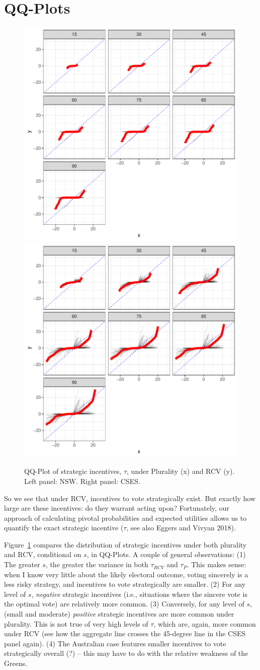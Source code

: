 \documentclass[11pt, letter, margin = 2 in]{article}
\begin{document}
\section{QQ-Plots}

\begin{figure}[!h]
	\centering
	\includegraphics[width = .45 \textwidth]{"../output/figures/australia_sv_qq"}
	\includegraphics[width = .45 \textwidth]{"../output/figures/cses_qq"}
	\caption{QQ-Plot of strategic incentives, $\tau$, under Plurality (x) and RCV (y). Left panel: NSW. Right panel: CSES.}
	\label{fig:qqplots}
\end{figure}

So we see that under RCV, incentives to vote strategically exist. But exactly how large are these incentives: do they warrant acting upon? Fortunately, our approach of calculating pivotal probabilities and expected utilities allows us to quantify the exact strategic incentive ($\tau$, see also Eggers and Vivyan 2018). 

Figure~\ref{fig:qqplots} compares the distribution of strategic incentives under both plurality and RCV, conditional on $s$, in QQ-Plots. A couple of general observations: (1) The greater $s$, the greater the variance in both $\tau_{RCV}$ and  $\tau_{P}$. This makes sense: when I know very little about the likely electoral outcome, voting sincerely is a less risky strategy, and incentives to vote strategically are smaller. (2) For any level of $s$, \textit{negative} strategic incentives (i.e., situations where the sincere vote is the optimal vote) are relatively more common. (3) Conversely, for any level of $s$, (small and moderate) \textit{positive} strategic incentives are more common under plurality. This is not true of very high levels of $\tau$, which are, again, more common under RCV (see how the aggregate line crosses the 45-degree line in the CSES panel again). (4) The Australian case features smaller incentives to vote strategically overall (?) -- this may have to do with the relative weakness of the Greens. 
\end{document}
